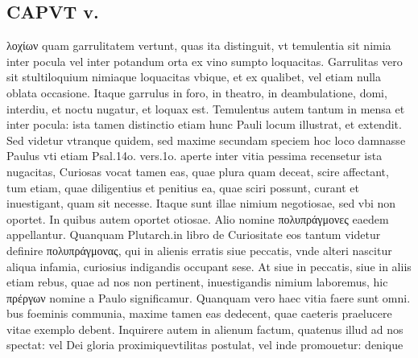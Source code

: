 \documentclass{article}
\begin{document}
\begin{pages}
\section*{CAPVT  v. }
\marginpar{[ p.287 ]}
\marginpar{[ p.0 ]}\pstart λοχίων quam garrulitatem vertunt, quas ita distinguit, vt temulentia sit nimia inter pocula vel inter potandum orta ex vino sumpto loquacitas. Garrulitas vero sit stultiloquium nimiaque loquacitas vbique, et ex qualibet, vel etiam nulla oblata occasione. Itaque garrulus in foro, in theatro, in deambulatione, domi, interdiu, et noctu nugatur, et loquax est. Temulentus autem tantum in mensa et inter pocula: ista tamen distinctio etiam hunc Pauli locum illustrat, et extendit. Sed videtur vtranque quidem, sed maxime secundam speciem hoc loco damnasse Paulus vti etiam Psal.14o. vers.1o. aperte inter vitia pessima recensetur ista nugacitas, Curiosas vocat tamen eas, quae plura quam deceat, scire affectant, tum etiam, quae diligentius et penitius ea, quae sciri possunt, curant et inuestigant, quam sit necesse. Itaque sunt illae nimium negotiosae, sed vbi non oportet. In quibus autem oportet otiosae. Alio nomine πολυπράγμονες eaedem appellantur. Quanquam Plutarch.in libro de Curiositate eos tantum videtur definire πολυπράγμονας, qui in alienis erratis siue peccatis, vnde alteri nascitur aliqua infamia, curiosius indigandis occupant sese. At siue in peccatis, siue in aliis etiam rebus, quae ad nos non pertinent, inuestigandis nimium laboremus, hic πρέργων nomine a Paulo significamur. Quanquam vero haec vitia faere sunt omni. bus foeminis communia, maxime tamen eas dedecent, quae caeteris praelucere vitae exemplo debent. Inquirere autem in alienum factum, quatenus illud ad nos spectat: vel Dei gloria proximiquevtilitas postulat, vel inde promouetur: denique  \pend

\end{pages}
\end{document}
